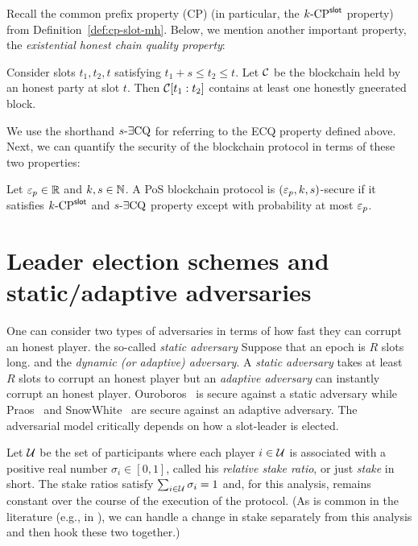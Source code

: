     Recall the common prefix property (CP) (in particular, the ${k}\text{-}\mathrm{CP}^{\mathsf{slot}}$ property) 
    from Definition~\ref{def:cp-slot-mh}. 
    Below, we mention another important property, 
    the \emph{existential honest chain quality property}: 


    \begin{definition}\label{def:ECQ}        
        Consider slots $t_1, t_2, t$ satisfying $t_1 + s \leq t_2 \leq t$. 
        Let $\mathcal{C}$ be the blockchain held by an honest party at slot $t$. 
        Then $\mathcal{C}[t_1:t_2]$ contains at least one 
        honestly gneerated block.
    \end{definition}
    We use the shorthand ${s}\text{-}\exists\mathrm{CQ}$ for referring to the ECQ property defined above. 
    Next, we can quantify the security of the blockchain protocol in terms of these two properties:

    \begin{definition}\label{def:blockchain-security}
        Let $\mathsf{\varepsilon}_p \in \mathbb{R}$ and $k, s \in \mathbb{N}$. 
        A PoS blockchain protocol is $(\mathsf{\varepsilon}_p, k, s)$-secure if 
        it satisfies ${k}\text{-}\mathrm{CP}^{\mathsf{slot}}$ and ${s}\text{-}\exists\mathrm{CQ}$ property 
        except with probability at most $\mathsf{\varepsilon}_p$.
    \end{definition}



\section{Leader election schemes and static/adaptive adversaries}\label{sec:leader-election-public-private}\label{sec:static-dynamic-adversary}

One can consider two types of adversaries in terms of 
how fast they can corrupt an honest player. the so-called \emph{static adversary} 
Suppose that an epoch is $R$ slots long. 
and the \emph{dynamic (or adaptive) adversary}. 
A \emph{static adversary} takes at least $R$ slots to corrupt an honest player 
but an \emph{adaptive adversary} can instantly corrupt an honest player. 
Ouroboros~\cite {Ouroboros} is secure against a static adversary 
while Praos~\cite {Praos} and SnowWhite~\cite{SnowWhite} 
are secure against an adaptive adversary.
The adversarial model critically depends on how a slot-leader is elected. 

Let
$\mathcal{U}$ be the set of participants 
where each player $i \in \mathcal{U}$ is associated with a positive real number 
$\sigma_i \in [0,1]$, called his \emph{relative stake ratio}, or just \emph{stake} in short. 
The stake ratios satisfy $\sum_{i \in \mathcal{U}} \sigma_i = 1$ 
and, for this analysis, remains constant over the course of the execution of the protocol. 
(As is common in the literature (e.g., in \cite{Ouroboros,Praos,SnowWhite}), 
we can handle a change in stake separately from this analysis and then hook these two together.)

